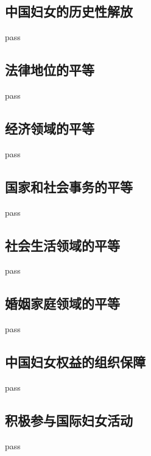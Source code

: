 \subsection{中国妇女的历史性解放}
\begin{frame}{}
    pass
\end{frame}



\subsection{法律地位的平等}
\begin{frame}{}
    pass
\end{frame}



\subsection{经济领域的平等}
\begin{frame}{}
    pass
\end{frame}



\subsection{国家和社会事务的平等}
\begin{frame}{}
    pass
\end{frame}



\subsection{社会生活领域的平等}
\begin{frame}{}
    pass
\end{frame}



\subsection{婚姻家庭领域的平等}
\begin{frame}{}
    pass
\end{frame}



\subsection{中国妇女权益的组织保障}
\begin{frame}{}
    pass
\end{frame}



\subsection{积极参与国际妇女活动}
\begin{frame}{}
    pass
\end{frame}
